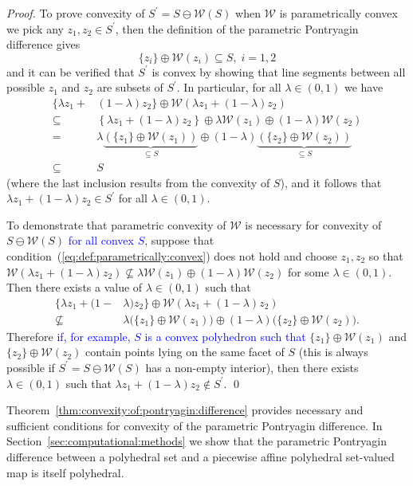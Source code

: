 \documentclass[smallextended]{svjour3}       %
\numberwithin{equation}{section}
\newcommand{\revision}[1]{\textcolor{blue}{#1}}
\begin{document}
\begin{proof}
To prove convexity of $S^\prime =  S\ominus \mathcal W( S)$ when $\mathcal W$ is parametrically convex we pick any $z_1,z_2\in S^\prime$, then
the definition of the parametric Pontryagin difference gives
\begin{equation}
  \{z_i\} \oplus \mathcal W(z_i) \subseteq S,\; i=1,2 
\end{equation}
%
and it can be verified that $S^\prime$ is convex by showing that line segments between all possible $z_1$ and $z_2$ are subsets of $S^\prime$. In particular, for all $\lambda \in (0,1)$ we have
\begin{align*}
  \{ \lambda z_1 + &(1-\lambda)z_2
  \}\oplus \mathcal W\left( \lambda z_1 + (1-\lambda)z_2\right)\\
  \subseteq&\left\{ \lambda z_1 + (1-\lambda)z_2
  \right\}\oplus \lambda \mathcal W(z_1) \oplus (1-\lambda)
  \mathcal W(z_2)\\
 = &\lambda\underbrace{(\{z_1\}\oplus \mathcal W(z_1))}_{\subseteq S}\oplus
  (1-\lambda)\underbrace{(\{z_2\}\oplus \mathcal W(z_2))}_{\subseteq S}\\
  \subseteq& S
\end{align*}
%
(where the last inclusion results from the convexity of $S$), and it follows that
$\lambda z_1 + (1-\lambda) z_2 \in S^\prime$ for all $\lambda \in (0,1)$. 
%

To demonstrate that parametric convexity of $\mathcal W$ is necessary for convexity of $S\ominus \mathcal W(S)$ \revision{for all convex $S$}, suppose that condition~(\ref{eq:def:parametrically:convex}) does not hold and choose $z_1,z_2$ so that $\mathcal W(\lambda z_1 + (1-\lambda) z_2) \not\subseteq \lambda \mathcal W(z_1) \oplus (1-\lambda) \mathcal W (z_2)$ for some $\lambda \in (0,1)$. Then there exists a value of $\lambda\in(0,1)$ such that
\begin{align*}
  \{ \lambda z_1 + (1-&\lambda)z_2
  \}\oplus \mathcal W\left( \lambda z_1 + (1-\lambda)z_2\right)\\
 \not\subseteq &\lambda\bigl(\{z_1\}\oplus \mathcal W(z_1)\bigr)\oplus
  (1-\lambda)\bigl(\{z_2\}\oplus \mathcal W(z_2)\bigr) .
\end{align*}
Therefore \revision{if, for example, $S$ is a convex polyhedron such that} $\{z_1\}\oplus\mathcal W(z_1)$ and $\{z_2\}\oplus\mathcal W(z_2)$ contain points lying on the same facet of $S$ (this is always possible if $S^\prime=S\ominus \mathcal W(S)$ has a non-empty interior), then there exists $\lambda \in (0,1)$ such that $\lambda z_1 + (1-\lambda) z_2 \notin S^\prime$.
\qed
\end{proof}
%
Theorem~\ref{thm:convexity:of:pontryagin:difference} provides necessary and sufficient conditions for convexity of the parametric Pontryagin difference. 
%
In Section~\ref{sec:computational:methods}
we show that the parametric Pontryagin difference between a polyhedral set and a piecewise affine polyhedral set-valued map is itself polyhedral.
%
%
%
%
\end{document}
